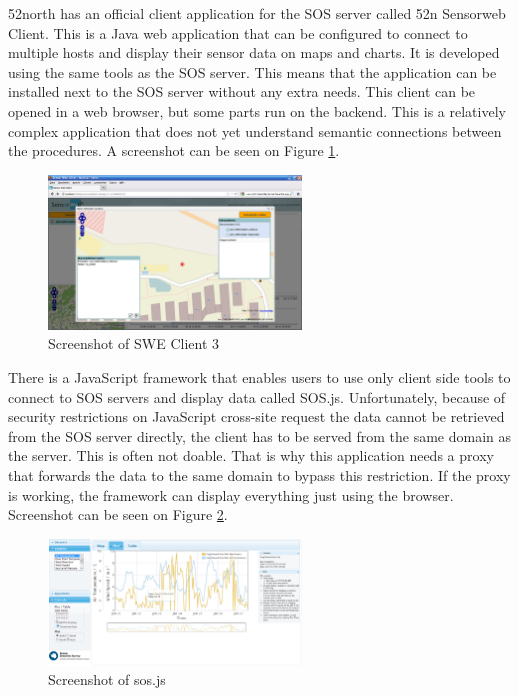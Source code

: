 52north has an official client application for the SOS server called 52n Sensorweb Client. This is a Java web application that can be configured to connect to multiple hosts and display their sensor data on maps and charts. It is developed using the same tools as the SOS server. 
This means that the application can be installed next to the SOS server without any extra needs. This client can be opened in a web browser, but some parts run on the backend. This is a relatively complex application that does not yet understand semantic connections between the procedures. A screenshot can be seen on Figure \ref{fig:sweclient}.

\begin{figure}[h]
\centering
\includegraphics[width=0.6\textwidth]{figures/sweclient.png}
\caption{Screenshot of SWE Client 3\label{fig:sweclient}}
\end{figure}

There is a JavaScript framework that enables users to use only client side tools to connect to SOS servers and display data called SOS.js. Unfortunately, because of security restrictions on JavaScript cross-site request the data cannot be retrieved from the SOS server directly, the client has to be served from the same domain as the server. This is often not doable. That is why this application needs a proxy that forwards the data to the same domain to bypass this restriction. If the proxy is working, the framework can display everything just using the browser. Screenshot can be seen on Figure \ref{fig:sos-js}.

\begin{figure}[h]
\centering
\includegraphics[width=0.6\textwidth]{figures/sos-js.png}
\caption{Screenshot of sos.js\label{fig:sos-js}}
\end{figure}

